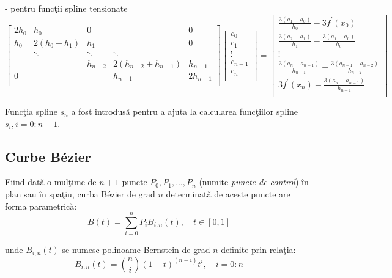 \documentclass{exam}
\begin{document}
- pentru funcţii spline tensionate
\begin{equation*}
	\begin{bmatrix}
		{2h_0} & {h_0}        & {0}       & {   }                & { 0 }      \\
		{h_0}  & {2(h_0+h_1)} & {h_1}     & {   }                & {0 }       \\
		{   }  & \ddots       & \ddots    & \ddots               & { }        \\
		{   }  & { }          & {h_{n-2}} & {2(h_{n-2}+h_{n-1})} & {h_{n-1}}  \\
		{ 0 }  & {   }        & { }       & {h_{n-1}}            & {2h_{n-1}} \\
	\end{bmatrix}
	\begin{bmatrix}
		{c_0 }     \\
		{c_1 }     \\
		\vdots     \\
		{c_{n-1} } \\
		{c_n }     \\
	\end{bmatrix}
	=
	\begin{bmatrix}
		\frac {3(a_1-a_0)}{h_0} - 3f^{'}(x_0)                                   \\
		\frac {3(a_2-a_1)}{h_1} - \frac {3(a_1-a_0)}{h_0}                       \\
		\vdots                                                                  \\
		\frac {3(a_{n}-a_{n-1})}{h_{n-1}} - \frac {3(a_{n-1}-a_{n-2})}{h_{n-2}} \\
		3f^{'}(x_n) - \frac {3(a_n - a_{n-1})}{h_{n-1}}                         \\
	\end{bmatrix}
\end{equation*}

Funcţia spline $s_n$ a fost introdusă pentru a ajuta la calcularea funcţiilor spline $s_i, i=0:n-1$.

\subsection{Curbe B\'{e}zier}
Fiind dată o mulţime de $n+1$ puncte $P_0,P_1,...,P_n$ (numite \textit{puncte de control}) în plan sau în spaţiu, curba B\'{e}zier de grad $n$ determinată de aceste puncte are forma parametrică:
$$B(t) = \sum\limits_{i=0}^n P_iB_{i,n}(t), \quad t\in[0,1]$$

\noindent unde $B_{i,n}(t)$ se numesc polinoame Bernstein de grad $n$ definite prin relaţia:
$$B_{i,n}(t) = {n \choose i} (1-t)^{(n-i)}t^i, \quad i=0:n $$
\end{document}
